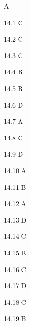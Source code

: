 \begin{Solution}{14}
A
\end{Solution}
\begin{Solution}{14.{1}}
C
\end{Solution}
\begin{Solution}{14.{2}}
C
\end{Solution}
\begin{Solution}{14.{3}}
C
\end{Solution}
\begin{Solution}{14.{4}}
B
\end{Solution}
\begin{Solution}{14.{5}}
B
\end{Solution}
\begin{Solution}{14.{6}}
D
\end{Solution}
\begin{Solution}{14.{7}}
A
\end{Solution}
\begin{Solution}{14.{8}}
C
\end{Solution}
\begin{Solution}{14.{9}}
D
\end{Solution}
\begin{Solution}{14.{10}}
A
\end{Solution}
\begin{Solution}{14.{11}}
B
\end{Solution}
\begin{Solution}{14.{12}}
A
\end{Solution}
\begin{Solution}{14.{13}}
D
\end{Solution}
\begin{Solution}{14.{14}}
C
\end{Solution}
\begin{Solution}{14.{15}}
B
\end{Solution}
\begin{Solution}{14.{16}}
C
\end{Solution}
\begin{Solution}{14.{17}}
D
\end{Solution}
\begin{Solution}{14.{18}}
C
\end{Solution}
\begin{Solution}{14.{19}}
B
\end{Solution}
